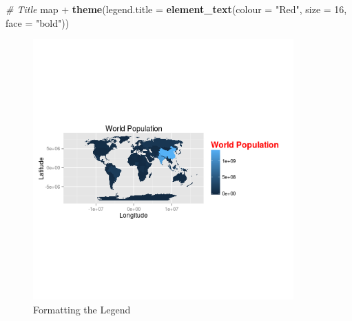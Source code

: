 \documentclass[]{article}
\newenvironment{Shaded}{}{}
\newcommand{\KeywordTok}[1]{\textcolor[rgb]{0.00,0.44,0.13}{\textbf{{#1}}}}
\newcommand{\DataTypeTok}[1]{\textcolor[rgb]{0.56,0.13,0.00}{{#1}}}
\newcommand{\DecValTok}[1]{\textcolor[rgb]{0.25,0.63,0.44}{{#1}}}
\newcommand{\StringTok}[1]{\textcolor[rgb]{0.25,0.44,0.63}{{#1}}}
\newcommand{\CommentTok}[1]{\textcolor[rgb]{0.38,0.63,0.69}{\textit{{#1}}}}
\newcommand{\NormalTok}[1]{{#1}}
\let\Oldincludegraphics\includegraphics
\renewcommand{\includegraphics}[1]{\Oldincludegraphics[width=10cm]{#1}}
\begin{document}
\begin{Shaded}
\begin{Highlighting}[]

\CommentTok{# Title}
\NormalTok{map + }\KeywordTok{theme}\NormalTok{(}\DataTypeTok{legend.title =} \KeywordTok{element_text}\NormalTok{(}\DataTypeTok{colour =} \StringTok{"Red"}\NormalTok{, }\DataTypeTok{size =} \DecValTok{16}\NormalTok{, }\DataTypeTok{face =} \StringTok{"bold"}\NormalTok{))}
\end{Highlighting}
\end{Shaded}
\begin{figure}[htbp]
\centering
\includegraphics{figure/Formatting_the_Legend2.png}
\caption{Formatting the Legend}
\end{figure}
\end{document}
